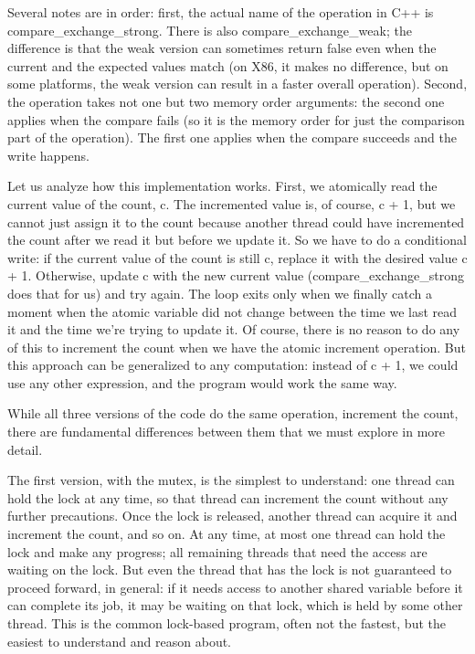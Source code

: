 Several notes are in order: first, the actual name of the operation in C++ is compare\_exchange\_strong. There is also compare\_exchange\_weak; the difference is that the weak version can sometimes return false even when the current and the expected values match (on X86, it makes no difference, but on some platforms, the weak version can result in a faster overall operation). Second, the operation takes not one but two memory order arguments: the second one applies when the compare fails (so it is the memory order for just the comparison part of the operation). The first one applies when the compare succeeds and the write happens.

Let us analyze how this implementation works. First, we atomically read the current value of the count, c. The incremented value is, of course, c + 1, but we cannot just assign it to the count because another thread could have incremented the count after we read it but before we update it. So we have to do a conditional write: if the current value of the count is still c, replace it with the desired value c + 1. Otherwise, update c with the new current value (compare\_exchange\_strong does that for us) and try again. The loop exits only when we finally catch a moment when the atomic variable did not change between the time we last read it and the time we're trying to update it. Of course, there is no reason to do any of this to increment the count when we have the atomic increment operation. But this approach can be generalized to any computation: instead of c + 1, we could use any other expression, and the program would work the same way. 

While all three versions of the code do the same operation, increment the count, there are fundamental differences between them that we must explore in more detail.


The first version, with the mutex, is the simplest to understand: one thread can hold the lock at any time, so that thread can increment the count without any further precautions. Once the lock is released, another thread can acquire it and increment the count, and so on. At any time, at most one thread can hold the lock and make any progress; all remaining threads that need the access are waiting on the lock. But even the thread that has the lock is not guaranteed to proceed forward, in general: if it needs access to another shared variable before it can complete its job, it may be waiting on that lock, which is held by some other thread. This is the common lock-based program, often not the fastest, but the easiest to understand and reason about.


